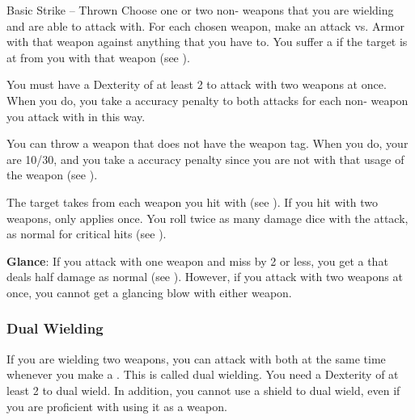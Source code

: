         \begin{activeability}{Basic Strike -- Thrown}
            \label{Thrown Strike}
            \rankline
            Choose one or two non- weapons that you are wielding and are able to attack with.
            For each chosen weapon, make an attack vs. Armor with that weapon against anything that you have  to.
            You suffer a  if the target is at  from you with that weapon (see ).

            You must have a Dexterity of at least 2 to attack with two weapons at once.
            When you do, you take a  accuracy penalty to both attacks for each non- weapon you attack with in this way.

            You can throw a weapon that does not have the  weapon tag.
            When you do, your  are 10/30, and you take a  accuracy penalty since you are not  with that usage of the weapon (see ).

            \hit The target takes  from each weapon you hit with (see ).
            If you hit with two weapons,  only applies once.
            \crit You roll twice as many damage dice with the attack, as normal for critical hits (see ).
            \par \textbf{Glance}: If you attack with one weapon and miss by 2 or less, you get a  that deals half damage as normal (see ).
            However, if you attack with two weapons at once, you cannot get a glancing blow with either weapon.
        \end{activeability}

        \subsubsection{Dual Wielding}\label{Dual Wielding}
            If you are wielding two weapons, you can attack with both at the same time whenever you make a .
            This is called dual wielding.
            You need a Dexterity of at least 2 to dual wield.
            In addition, you cannot use a shield to dual wield, even if you are proficient with using it as a weapon.

